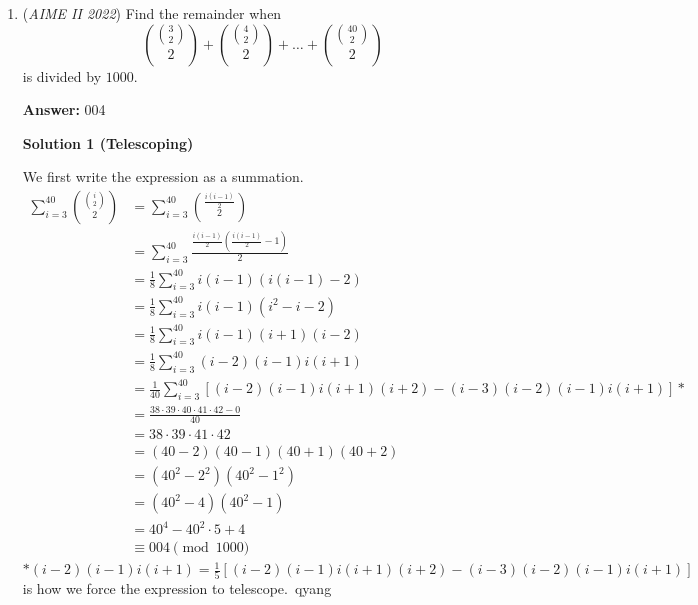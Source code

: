 \begin{enumerate}
 Observe that each intersection point can be mapped to two points on either line, and analogously, two points on either line can be mapped to one intersection point, uniquely. Thus, to count intersection points, we simply calculate:

 ${7 \choose 2}{5 \choose 2} = 210$

 And thus,

 $V=V_{i}+210=222$

 We must also account for the edges. Observe that each intersection point turns the two edges that make it into four, that is, each intersection point adds $2$ to the number of edges. Therefore,

 $E=E_{i}+2\cdot210=465$

 Plugging these into Euler's Formula we get:$F-E+V=2$
$F-465+222=2$
$F=245$

 Disregarding the outer region, we conclude that our answer is $F-1=245-1=\boxed {244}$



	\item (\textit{AIME II 2022}) Find the remainder when
 \[\binom{\binom{3}{2}}{2} + \binom{\binom{4}{2}}{2} + \dots +  \binom{\binom{40}{2}}{2}\]is divided by $1000$.


 
 \textbf{Answer: }004



\textbf{Solution 1 (Telescoping)}

We first write the expression as a summation.
 \begin{align*} \sum_{i=3}^{40} \binom{\binom{i}{2}}{2}  & = \sum_{i=3}^{40} \binom{\frac{i \left( i - 1 \right)}{2}}{2} \\ & = \sum_{i=3}^{40} \frac{\frac{i \left( i - 1 \right)}{2} \left( \frac{i \left( i - 1 \right)}{2}- 1 \right)}{2} \\ & = \frac{1}{8} \sum_{i=3}^{40}  i \left( i - 1 \right) \left( i \left( i - 1 \right) - 2 \right)  \\ & = \frac{1}{8} \sum_{i=3}^{40} i(i - 1)(i^2-i-2) \\ & = \frac{1}{8} \sum_{i=3}^{40} i(i-1)(i+1)(i-2) \\ & = \frac{1}{8}\sum_{i=3}^{40} (i-2)(i-1)i(i+1) \\ & = \frac{1}{40}\sum_{i=3}^{40}[(i-2)(i-1)i(i+1)(i+2)-(i-3)(i-2)(i-1)i(i+1)]* \\ & = \frac{38\cdot39\cdot40\cdot41\cdot42-0}{40}\\ & = 38 \cdot 39 \cdot 41 \cdot 42 \\ & = \left( 40 - 2 \right) \left( 40 - 1 \right) \left( 40 + 1 \right) \left( 40 + 2 \right) \\ & = \left( 40^2 - 2^2 \right) \left( 40^2 - 1^2 \right) \\ & = \left( 40^2 - 4 \right) \left( 40^2 - 1 \right) \\ & = 40^4 - 40^2 \cdot 5 + 4 \\ & \equiv \boxed{004}\pmod{1000}\ \end{align*}
$*(i-2)(i-1)i(i+1)=\frac{1}{5}[(i-2)(i-1)i(i+1)(i+2)-(i-3)(i-2)(i-1)i(i+1)]$ is how we force the expression to telescope.~qyang


\end{enumerate}
